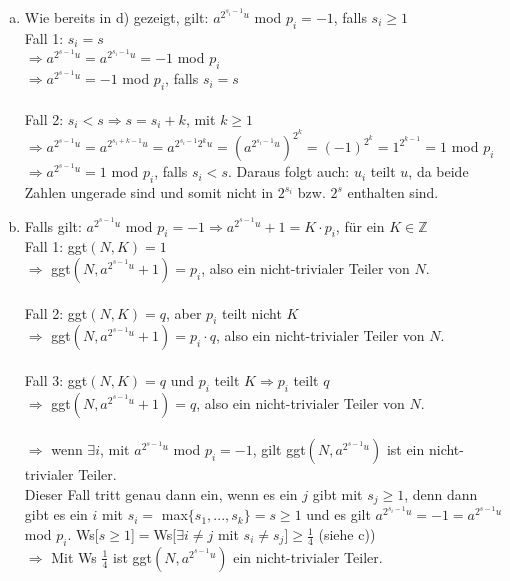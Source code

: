 \documentclass[a4paper]{scrartcl}
\begin{document}
\begin{enumerate}[a)]
\item Wie bereits in d) gezeigt, gilt: $a^{2^{s_i-1}u}$ mod $ p_i=-1$, falls $s_i\geq 1$\\
Fall 1: $s_i=s$\\
$\Rightarrow a^{2^{s-1}u} = a^{2^{s_i-1}u}=-1$ mod $p_i$\\
$\Rightarrow a^{2^{s-1}u} = -1$ mod $p_i$, falls $s_i=s$\\\\

Fall 2: $s_i < s \Rightarrow s = s_i+k$, mit $k\geq 1$\\
$\Rightarrow a^{2^{s-1}u} = a^{2^{s_i+k-1}u}=a^{2^{s_i-1}2^ku} = (a^{2^{s_i-1}u})^{2^k} = (-1)^{2^k} = 1^{2^{k-1}}= 1$ mod $p_i$\\
$\Rightarrow a^{2^{s-1}u} = 1$ mod $p_i$, falls $s_i<s$. Daraus folgt auch: $u_i$ teilt $u$, da beide Zahlen ungerade sind und somit nicht in $2^{s_i}$ bzw. $2^s$ enthalten sind.\\



\item
Falls gilt: $a^{2^{s-1}u}$ mod $p_i=-1 \Rightarrow a^{2^{s-1}u}+1=K\cdot p_i$, für ein $K\in \mathbb{Z}$\\
Fall 1: ggt$(N,K)=1$\\
$\Rightarrow$ ggt$(N, a^{2^{s-1}u}+1) = p_i$, also ein nicht-trivialer Teiler von $N$.\\\\

Fall 2: ggt$(N, K)=q$, aber $p_i$ teilt nicht $K$\\

$\Rightarrow$ ggt$(N, a^{2^{s-1}u}+1) = p_i \cdot q$, also ein nicht-trivialer Teiler von $N$. \\\\
 
Fall 3:  ggt$(N,K)=q$ und $p_i$ teilt $K \Rightarrow p_i$ teilt $q$ \\
$\Rightarrow$ ggt$(N, a^{2^{s-1}u}+1) = q$, also ein nicht-trivialer Teiler von $N$. \\\\

$\Rightarrow$ wenn $\exists i$, mit $a^{2^{s-1}u}$ mod $p_i=-1$, gilt ggt$(N, a^{2^{s-1}u})$ ist ein nicht-trivialer Teiler.\\
Dieser Fall tritt genau dann ein, wenn es ein $j$ gibt mit $s_j\geq 1$, denn dann gibt es ein $i$ mit $s_i=$ max$\{s_1, ..., s_k\}=s\geq 1$ und es gilt $a^{2^{s_i-1}u} =-1 = a^{2^{s-1}u}$ mod $p_i$.
Ws[$ s\geq 1$]$=$Ws[$\exists i \neq j$ mit $s_i \neq s_j$]$\geq\frac{1}{4}$ (siehe c))\\
$\Rightarrow$ Mit Ws $\frac{1}{4}$ ist ggt$(N, a^{2^{s-1}u})$ ein nicht-trivialer Teiler.




\end{enumerate}
\end{document}
